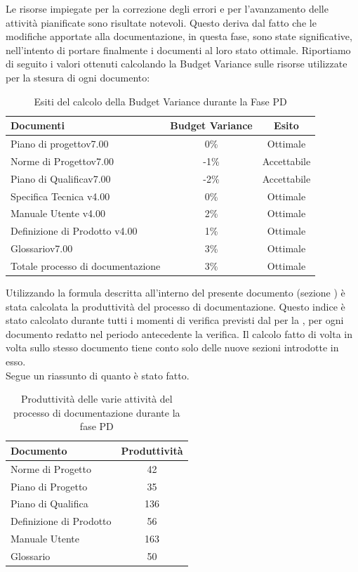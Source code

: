			Le risorse impiegate per la correzione degli errori e per l'avanzamento delle attività pianificate sono risultate notevoli. Questo deriva dal fatto che le modifiche apportate alla documentazione, in questa fase, sono state significative, nell'intento di portare finalmente i documenti al loro stato ottimale.
			Riportiamo di seguito i valori ottenuti calcolando la Budget Variance sulle risorse utilizzate per la stesura di ogni documento:
			\begin{table}[H]
					\centering
					\begin{tabu}{| l | c | c |}
							\hline
							Documenti 							& Budget Variance	& Esito		\\ \hline \hline							
							Piano di progettov7.00				& 0\% 		& Ottimale  \\ \hline
							Norme di Progettov7.00 			& -1\%		& Accettabile  \\ \hline
							Piano di Qualificav7.00 			& -2\%		& Accettabile  \\ \hline
							Specifica Tecnica v4.00 			& 0\%		& Ottimale  \\ \hline
							Manuale Utente v4.00 				& 2\%		& Ottimale  \\ \hline
							Definizione di Prodotto v4.00 		& 1\%		& Ottimale  \\ \hline
							Glossariov7.00					 	& 3\% 		& Ottimale  \\ \hline
							Totale processo di documentazione 	& 3\% 		& Ottimale \\ \hline
					\end{tabu}
				\caption{Esiti del calcolo della Budget Variance durante la Fase PD}
			\end{table}
							
			Utilizzando la formula descritta all'interno del presente documento (sezione ) è stata calcolata la produttività del processo di documentazione. Questo indice è stato calcolato durante tutti i momenti di verifica previsti dal  per la , per ogni documento redatto nel periodo antecedente la verifica. Il calcolo fatto di volta in volta sullo stesso documento tiene conto solo delle nuove sezioni introdotte in esso.\\
			Segue un riassunto di quanto è stato fatto.
			\begin{table}[H]
			      \centering
					\begin{tabu}{| l | c |}
					\hline
					Documento & Produttività	\\ \hline
					Norme di Progetto	& 42 \\ \hline
					Piano di Progetto	& 35 \\ \hline
					Piano di Qualifica	& 136 \\ \hline
					Definizione di Prodotto & 56 \\ \hline
					Manuale Utente & 163 \\ \hline
					Glossario & 50 \\ \hline
					\end{tabu}
					\caption{Produttività delle varie attività del processo di documentazione durante la fase PD}
			\end{table}
			

